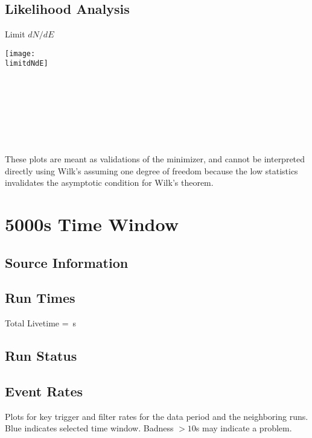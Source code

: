 \documentclass[titlepage]{article}
\begin{document}
\subsection{Likelihood Analysis}
\results
\pagebreak

\backgroundpdfplot

\survivialfunctionplot

\pagebreak
{
  \centering

  {\Large Limit $dN/dE$}

  \texttt{[image: \\limitdNdE]}
  \\
  \\

  \tsd

  \\
  \\
  \upperlim

  \\
  \\
  \nsscan

  These plots are meant as validations of the minimizer, and cannot be interpreted directly using Wilk's assuming one degree of freedom because the low statistics invalidates the asymptotic condition for Wilk's theorem.
}

\vfill

\pagebreak
\section{5000s Time Window}

\subsection{Source Information}
\sourcetable

\subsection{Run Times}
\runtimetable

Total Livetime = \livetime\,s

\subsection{Run Status}
\runstatustable

\pagebreak
\subsection{Event Rates}
Plots for key trigger and filter rates for the data period
and the neighboring runs.  Blue indicates selected time window.
Badness $>10$s may indicate a problem.
\end{document}
